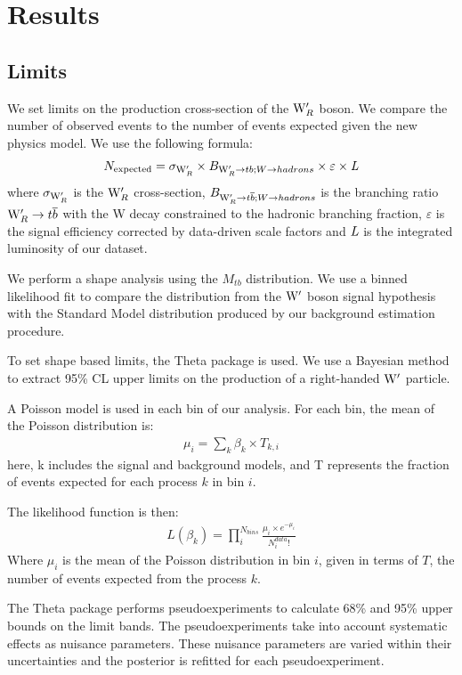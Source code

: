 \clearpage
\newpage
\chapter{Results}
\section{Limits}
\label{sec:stats}
We set limits on the production cross-section of 
the $\mathrm{W}^\prime_R$ boson. We compare the number 
of observed events to the number of events expected given the new physics model. We use the following formula:
\begin{eqnarray}
N_{\textrm{expected}} = \sigma_{\mathrm{W}^\prime_R} \times B_{\mathrm{W}^\prime_R \rightarrow tb;W \to hadrons} \times \varepsilon \times \emph{L}
\end{eqnarray}
where $\sigma_{\mathrm{W}^\prime_R}$ is the $\mathrm{W}^\prime_R$ cross-section, $B_{\mathrm{W}^\prime_R \rightarrow {t\overline{b}};W \to hadrons}$ is the branching ratio 
$\mathrm{W}^\prime_R \to {t\overline{b}}$ with the W decay constrained to the hadronic branching fraction, $\varepsilon$ is the signal efficiency corrected by data-driven scale factors and $\emph{L}$ is the integrated luminosity of our dataset. 

We perform a shape analysis using the $M_{tb}$ distribution.  We use a binned likelihood fit to compare the distribution from the $\mathrm{W}^\prime$ boson signal 
hypothesis with the Standard Model distribution produced by our background estimation procedure.  

\label{sec:Theta}
To set shape based limits, the Theta package \cite{theta} is used.  We use a Bayesian method to extract 95\% CL upper limits 
on the production of a right-handed $\mathrm{W}^\prime$ particle.  

A Poisson model is used in each bin of our analysis.  For each bin, the mean of the Poisson distribution is:
\begin{eqnarray}
\mu_i = \sum_k \beta_k \times T_{k,i}
\end{eqnarray}
here, k includes the signal and background models, and T represents the fraction of events expected for each process $k$ in bin $i$.

The likelihood function is then:
\begin{eqnarray}
L(\beta_k) = \prod^{N_{bins}}_i \frac{\mu_i \times e^{-\mu_i}}{N^{data}_i!}
\end{eqnarray}
Where $\mu_i$ is the mean of the Poisson distribution in bin $i$, given in terms of $T$, the number of events expected from the process $k$.

The Theta package performs pseudoexperiments to calculate 68\% and 95\% upper bounds on the limit bands.  
The pseudoexperiments take into account systematic effects as nuisance parameters.  These nuisance parameters 
are varied within their uncertainties and the posterior is refitted for each pseudoexperiment.  

